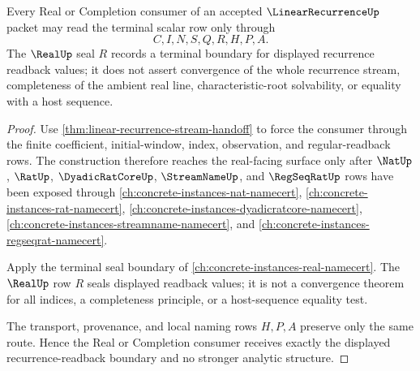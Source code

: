 \begin{theorem}
\label{thm:linear-recurrence-real-seal-boundary}
Every Real or Completion consumer of an accepted $\LinearRecurrenceUp$ packet may read the terminal scalar row only through
$$
C,I,N,S,Q,R,H,P,A .
$$
The $\RealUp$ seal $R$ records a terminal boundary for displayed recurrence readback values; it does not assert convergence of the whole recurrence stream, completeness of the ambient real line, characteristic-root solvability, or equality with a host sequence.
\end{theorem}
\begin{proof}
Use \autoref{thm:linear-recurrence-stream-handoff} to force the consumer through the finite coefficient, initial-window, index, observation, and regular-readback rows. The construction therefore reaches the real-facing surface only after $\NatUp$, $\RatUp$, $\DyadicRatCoreUp$, $\StreamNameUp$, and $\RegSeqRatUp$ rows have been exposed through \autoref{ch:concrete-instances-nat-namecert}, \autoref{ch:concrete-instances-rat-namecert}, \autoref{ch:concrete-instances-dyadicratcore-namecert}, \autoref{ch:concrete-instances-streamname-namecert}, and \autoref{ch:concrete-instances-regseqrat-namecert}.

Apply the terminal seal boundary of \autoref{ch:concrete-instances-real-namecert}. The $\RealUp$ row $R$ seals displayed readback values; it is not a convergence theorem for all indices, a completeness principle, or a host-sequence equality test.

The transport, provenance, and local naming rows $H,P,A$ preserve only the same route. Hence the Real or Completion consumer receives exactly the displayed recurrence-readback boundary and no stronger analytic structure.
\end{proof}


\begin{closurestatus}{\LinearRecurrenceUp}
  \theoryclosure{\seedClosure}
  \formalstatus{\unformalizedV}
\end{closurestatus}
